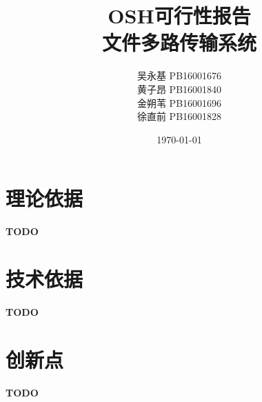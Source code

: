 \documentclass[11pt]{article}
\title{OSH可行性报告\\[2ex]文件多路传输系统}
\author{吴永基 PB16001676\\黄子昂 PB16001840\\金朔苇 PB16001696\\徐直前 PB16001828}
\date{\today}
\begin{document}
\maketitle
\tableofcontents

\section{理论依据}
\textbf{TODO}
\section{技术依据}
\textbf{TODO}
\section{创新点}
\textbf{TODO}
\end{document}
